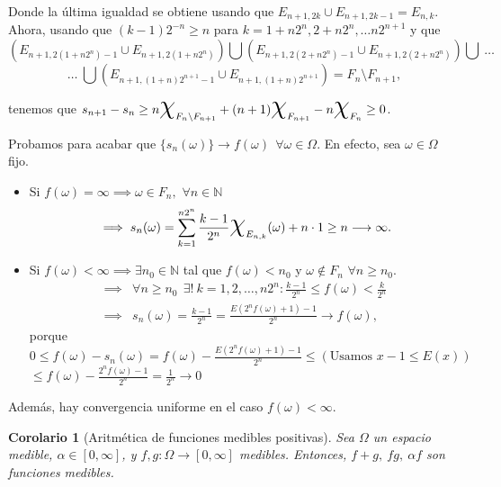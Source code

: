 \documentclass[11pt, a4paper]{article}
\makeatletter
\newif\IfInSansMode
\let\oldsf\sffamily
\renewcommand*{\sffamily}{\oldsf\mathversion{sans}\InSansModetrue}
\let\oldnorm\normalfont
\renewcommand*{\normalfont}{\oldnorm\InSansModefalse\mathversion{normal}}
\renewenvironment{proof}[1][\proofname] {\par\pushQED{\qed}\normalfont\topsep6\p@\@plus6\p@\relax\trivlist\item[\hskip\labelsep\itshape\sffamily#1\@addpunct{.}]\ignorespaces}{\popQED\endtrivlist\@endpefalse}
\theoremstyle{theorem-style}
\newtheorem{ncor}{Corolario}[section]
\theoremstyle{definition-style}
\theoremstyle{remark-style}
\theoremstyle{example-style}
\makeatother
\begin{document}
\begin{proof}
Donde la última igualdad se obtiene usando que $E_{n+1, 2k} \cup E_{n+1, 2k-1}=E_{n,k}$. Ahora, usando que $(k-1)2^{-n} \geq n$ para $k=1+n 2^n, 2+n 2^n,\dots n 2^{n+1}$ y que
\[
 \left( E_{n+1, 2(1+n2^n)-1} \cup E_{n+1, 2(1+n2^n)}  \right)
 \bigcup
 \left(E_{n+1, 2(2+n2^n)-1} \cup E_{n+1, 2(2+n2^n)} \right)
 \bigcup \
 \dots
\]
\[
 \dots \
 \bigcup
 \left( E_{n+1, (1+n)2^{n+1}-1} \cup E_{n+1, (1+n)2^{n+1}} \right) 
 =F_{n} \setminus F_{n+1},
\]

tenemos que $\displaystyle s_{n+1}-s_n \geq  n \text{\huge{$\chi$}}_{F_{n}\setminus F_{n+1}}+ (n+1) \text{\huge{$\chi$}}_{F_{n+1}} - n \text{\huge{$\chi$}}_{F_n} \geq 0$.


Probamos para acabar que $\{ s_n(\omega)\} \to f(\omega) \ \ \forall \omega\in\Omega$. En efecto, sea $\omega\in\Omega$ fijo. 
 \begin{itemize}
 \item Si $f(\omega)=\infty \implies \omega\in F_n, $ $\forall n\in \mathbb N$
 \[
 \implies s_n(\omega) =\sum_{k=1}^{n2^n} \frac{k-1}{2^n} \text{\huge{$\chi$}}_{E_{n,k}}(\omega) + n \cdot1\geq n\longrightarrow \infty .
 \]
 \item Si $f(\omega)<\infty \implies \exists n_0\in\mathbb N$ tal que $f(\omega)< n_0$ y $\omega\not\in F_n$ $\forall n\geq n_0$.
 \[
 \begin{aligned}
\implies& \forall n\geq n_0 \ \ \exists ! \ k= 1,2,\dots,n2^n : \frac{k-1}{2^n} \leq f(\omega) < \frac{k}{2^n}
\\
 \implies& s_n(\omega) = \frac{k-1}{2^n} = \frac{E(2^n f(\omega)+1)-1}{2^n} \longrightarrow f(\omega),
 \end{aligned}
  \]
porque $\displaystyle 0\leq f(\omega) - s_n(\omega) = f(\omega) - \frac{E(2^n f(\omega)+1)-1}{2^n} \le \left(\text{Usamos } x-1\leq E(x)\right)$\\ $\displaystyle \leq f(\omega) - \frac{2^n f(\omega)-1}{2^n}  = \frac{1}{2^n}\longrightarrow 0$
 \end{itemize}
\vspace{0.5em}
Además, hay convergencia uniforme en el caso $f(\omega) <\infty$.
\end{proof}

\begin{ncor}[Aritmética de funciones medibles positivas] \label{arit_medibles} Sea $\Omega$ un espacio medible, \mbox{$\alpha \in [0,\infty]$}, y $f,g : \Omega \to [0,\infty]$ medibles. Entonces, $f + g, \ fg, \ \alpha f$ son funciones medibles.
\end{ncor}
\end{document}
